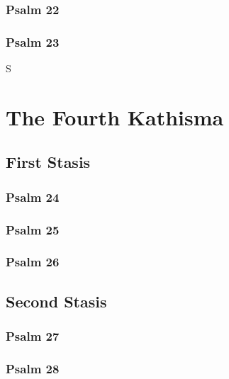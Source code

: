 \documentclass[12pt]{book}
\newcommand{\kathismabreak}{
  \medskip
  \begin{center}
  \begin{footnotesize}
  

  

  

  
  \end{footnotesize}
  \end{center}
  \smallbreak
}
\begin{document}
\subsubsection{Psalm 22}


\subsubsection{Psalm 23}

S
\kathismabreak

\section{The Fourth Kathisma}

\subsection{First Stasis}

\subsubsection{Psalm 24}


\subsubsection{Psalm 25}


\pagebreak %
\subsubsection{Psalm 26}


\pagebreak %
\kathismabreak

\subsection{Second Stasis}

\subsubsection{Psalm 27}


\subsubsection{Psalm 28}

\end{document}
